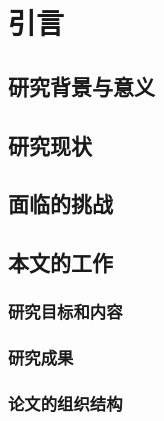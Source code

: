 
\chapter{引言}
\label{chap:introduction}

\section{研究背景与意义}
\section{研究现状}
\section{面临的挑战}
\section{本文的工作}
\subsection{研究目标和内容}
\subsection{研究成果}
\subsection{论文的组织结构}

